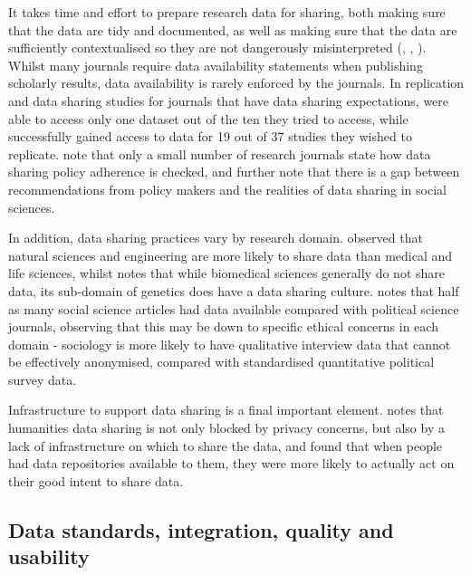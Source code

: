 \documentclass{CUP-JNL-DAP}%
\begin{document}
 It takes time and effort to prepare research data for sharing, both making sure that the data are tidy and documented, as well as making sure that the data are sufficiently contextualised so they are not dangerously misinterpreted (\cite{datasharing_rcts}, \cite{Yimei_Zhu_Open_access_in_uk}, \cite{empirical_datasharing_plos}). Whilst many journals require data availability statements when publishing scholarly results, data availability is rarely enforced by the journals. In replication and data sharing studies for journals that have data sharing expectations, \cite{empirical_datasharing_plos} were able to access only one dataset out of the ten they tried to access, while \cite{datasharing_rcts} successfully gained access to data for 19 out of 37 studies they wished to replicate. \cite{datasharing_sociology} note that only a small number of research journals state how data sharing policy adherence is checked, and further note that there is a gap between recommendations from policy makers and the realities of data sharing in social sciences. 
 
 In addition, data sharing practices vary by research domain. \cite{Yimei_Zhu_Open_access_in_uk} observed that natural sciences and engineering are more likely to share data than medical and life sciences, whilst \cite{datasharing_rcts} notes that while biomedical sciences generally do not share data, its sub-domain of genetics does have a data sharing culture. \cite{datasharing_sociology} notes that half as many social science articles had data available compared with political science journals, observing that this may be down to specific ethical concerns in each domain - sociology is more likely to have qualitative interview data that cannot be effectively anonymised, compared with standardised quantitative political survey data. 

Infrastructure to support data sharing is a final important element. \cite{Yimei_Zhu_Open_access_in_uk} notes that humanities data sharing is not only blocked by privacy concerns, but also by a lack of infrastructure on which to share the data, and \cite{Kim_Zhang_data_repos} found that when people had data repositories available to them, they were more likely to actually act on their good intent to share data.

\subsection{Data standards, integration, quality and usability}
\end{document}
